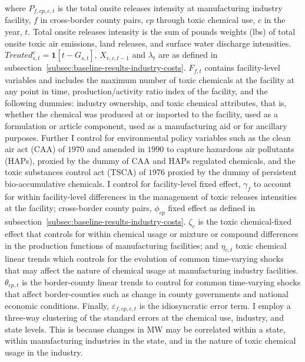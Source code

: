 \documentclass[12pt, english]{article}
\begin{document}
    where $P_{f,cp,c,t}$ is the total onsite releases intensity at manufacturing industry facility, $f$ in cross-border county pairs, $cp$ through toxic chemical use, $c$ in the year, $t$. Total onsite releases intensity is the sum of pounds weights (lbs) of total onsite toxic air emissions, land releases, and surface water discharge intensities. $Treated_{s,t}^e = \textbf{1}[t - G_{s,t}]$, $X_{v,c,t-1}$ and $\lambda_{t}$ are as defined in subsection~\ref{subsec:baseline-results-industry-costs}. $F_{f,t}$ contains facility-level variables and includes the maximum number of toxic chemicals at the facility at any point in time, production/activity ratio index of the facility, and the following dummies: industry ownership, and toxic chemical attributes, that is, whether the chemical was produced at or imported to the facility, used as a formulation or article component, used as a manufacturing aid or for ancillary purposes. Further I control for environmental policy variables such as the clean air act (CAA) of $1970$ and amended in $1990$ to capture hazardous air pollutants (HAPs), proxied by the dummy of CAA and HAPs regulated chemicals, and the toxic substances control act (TSCA) of $1976$ proxied by the dummy of persistent bio-accumulative chemicals. I control for facility-level fixed effect, $\gamma_{f}$ to account for within facility-level differences in the management of toxic releases intensities at the facility; cross-border county pairs, $\phi_{cp}$ fixed effect as defined in subsection~\ref{subsec:baseline-results-industry-costs}. $\zeta_{c}$ is the toxic chemical-fixed effect that controls for within chemical usage or mixture or compound differences in the production functions of manufacturing facilities; and $\eta_{c,t}$ toxic chemical linear trends which controls for the evolution of common time-varying shocks that may affect the nature of chemical usage at manufacturing industry facilities. $\theta_{cp,t}$ is the border-county linear trends to control for common time-varying shocks that affect border-counties such as change in county governments and national economic conditions. Finally, $\varepsilon_{f,cp,c,t}$ is the idiosyncratic error term. I employ a three-way clustering of the standard errors at the chemical use, industry, and state levels. This is because changes in MW may be correlated within a state, within manufacturing industries in the state, and in the nature of toxic chemical usage in the industry.
    
\end{document}

